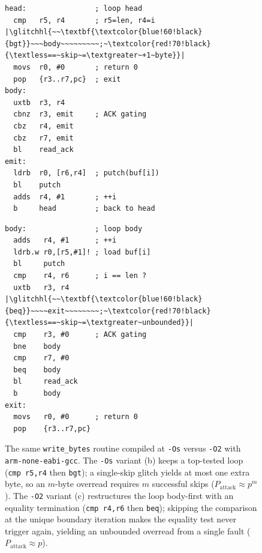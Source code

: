 \begin{figure}[t]
\vspace{0.4em}
\begin{minipage}[t]{0.48\linewidth}
\begin{lstlisting}[style=armasm]
head:                ; loop head
  cmp   r5, r4       ; r5=len, r4=i
|\glitchhl{~~\textbf{\textcolor{blue!60!black}{bgt}}~~~body~~~~~~~~~;~\textcolor{red!70!black}{\textless==~skip~=\textgreater~+1~byte}}|
  movs  r0, #0       ; return 0
  pop   {r3..r7,pc}  ; exit
body:
  uxtb  r3, r4
  cbnz  r3, emit     ; ACK gating
  cbz   r4, emit
  cbz   r7, emit
  bl    read_ack
emit:
  ldrb  r0, [r6,r4]  ; putch(buf[i])
  bl    putch
  adds  r4, #1       ; ++i
  b     head         ; back to head
\end{lstlisting}
\end{minipage}\hfill
\begin{minipage}[t]{0.48\linewidth}
\begin{lstlisting}[style=armasm]
body:                ; loop body
  adds   r4, #1      ; ++i
  ldrb.w r0,[r5,#1]! ; load buf[i]
  bl     putch
  cmp    r4, r6      ; i == len ?
  uxtb   r3, r4
|\glitchhl{~~\textbf{\textcolor{blue!60!black}{beq}}~~~~exit~~~~~~~~;~\textcolor{red!70!black}{\textless==~skip~=\textgreater~unbounded}}|
  cmp    r3, #0      ; ACK gating
  bne    body
  cmp    r7, #0
  beq    body
  bl     read_ack
  b      body
exit:
  movs   r0, #0      ; return 0
  pop    {r3..r7,pc}
\end{lstlisting}
\end{minipage}
\caption{The same \texttt{write\_bytes} routine compiled at \texttt{-Os} versus \texttt{-O2} with \texttt{arm-none-eabi-gcc}. The \texttt{-Os} variant (b) keeps a top-tested loop (\texttt{cmp r5,r4} then \texttt{bgt}); a single-skip glitch yields at most one extra byte, so an $m$-byte overread requires $m$ successful skips ($P_{\text{attack}}\!\approx\! p^m$). The \texttt{-O2} variant (c) restructures the loop body-first with an equality termination (\texttt{cmp r4,r6} then \texttt{beq}); skipping the comparison at the unique boundary iteration makes the equality test never trigger again, yielding an unbounded overread from a single fault ($P_{\text{attack}}\!\approx\! p$).}
\label{fig:motivating}
\end{figure}

